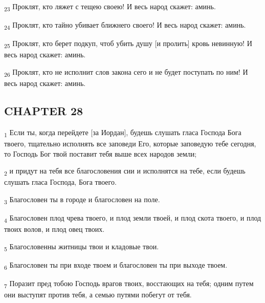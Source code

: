 \begin{tcolorbox}
\textsubscript{23} Проклят, кто ляжет с тещею своею! И весь народ скажет: аминь.
\end{tcolorbox}
\begin{tcolorbox}
\textsubscript{24} Проклят, кто тайно убивает ближнего своего! И весь народ скажет: аминь.
\end{tcolorbox}
\begin{tcolorbox}
\textsubscript{25} Проклят, кто берет подкуп, чтоб убить душу [и пролить] кровь невинную! И весь народ скажет: аминь.
\end{tcolorbox}
\begin{tcolorbox}
\textsubscript{26} Проклят, кто не исполнит слов закона сего и не будет поступать по ним! И весь народ скажет: аминь.
\end{tcolorbox}
\subsection{CHAPTER 28}
\begin{tcolorbox}
\textsubscript{1} Если ты, когда перейдете [за Иордан], будешь слушать гласа Господа Бога твоего, тщательно исполнять все заповеди Его, которые заповедую тебе сегодня, то Господь Бог твой поставит тебя выше всех народов земли;
\end{tcolorbox}
\begin{tcolorbox}
\textsubscript{2} и придут на тебя все благословения сии и исполнятся на тебе, если будешь слушать гласа Господа, Бога твоего.
\end{tcolorbox}
\begin{tcolorbox}
\textsubscript{3} Благословен ты в городе и благословен на поле.
\end{tcolorbox}
\begin{tcolorbox}
\textsubscript{4} Благословен плод чрева твоего, и плод земли твоей, и плод скота твоего, и плод твоих волов, и плод овец твоих.
\end{tcolorbox}
\begin{tcolorbox}
\textsubscript{5} Благословенны житницы твои и кладовые твои.
\end{tcolorbox}
\begin{tcolorbox}
\textsubscript{6} Благословен ты при входе твоем и благословен ты при выходе твоем.
\end{tcolorbox}
\begin{tcolorbox}
\textsubscript{7} Поразит пред тобою Господь врагов твоих, восстающих на тебя; одним путем они выступят против тебя, а семью путями побегут от тебя.
\end{tcolorbox}
